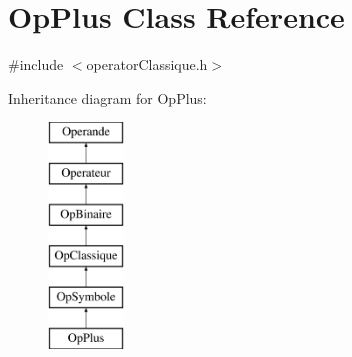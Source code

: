 \hypertarget{class_op_plus}{}\section{Op\+Plus Class Reference}
\label{class_op_plus}


{\ttfamily \#include $<$operator\+Classique.\+h$>$}

Inheritance diagram for Op\+Plus\+:\begin{figure}[H]
\begin{center}
\leavevmode
\includegraphics[height=6.000000cm]{class_op_plus}
\end{center}
\end{figure}
